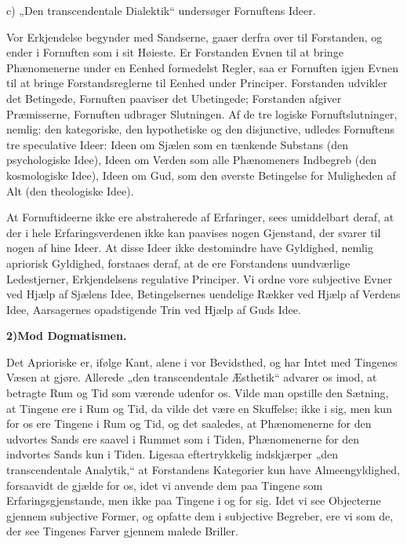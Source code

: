 \documentclass[12pt]{book}
\newcommand{\opage}[1]{\marginnote{\footnotesize\textit{[#1]}}}
\begin{document}
c) „Den transcendentale Dialektik“ undersøger Fornuftens Ideer.

Vor Erkjendelse begynder med Sandserne, gaaer derfra over til Forstanden, og ender
i Fornuften som i sit Høieste. Er Forstanden Evnen til at bringe Phænomenerne under
en Eenhed formedelst Regler, saa er Fornuften igjen Evnen til at bringe
Forstandsreglerne til Eenhed under Principer. Forstanden udvikler det Betingede,
Fornuften paaviser det Ubetingede; Forstanden afgiver Præmisserne, Fornuften
udbrager Slutningen. Af de tre logiske Fornuftslutninger, nemlig: den kategoriske,
den hypothetiske og den disjunctive, udledes Fornuftens tre speculative Ideer:
Ideen om Sjælen som en tænkende Substans (den psychologiske Idee), Ideen om Verden
som alle Phænomeners Indbegreb (den kosmologiske Idee), Ideen om Gud, som den
øverste Betingelse for Muligheden af Alt (den theologiske Idee).

At Fornuftideerne ikke ere abstraherede af Erfaringer, sees umiddelbart deraf, at
der i hele Erfaringsverdenen ikke kan paavises nogen Gjenstand, der svarer til
nogen af hine Ideer. At disse Ideer ikke destomindre have Gyldighed, nemlig
apriorisk Gyldighed, forstaaes deraf, at de ere Forstandens uundværlige
Ledestjerner, Erkjendelsens regulative Principer. Vi ordne vore subjective Evner
ved Hjælp af Sjælens Idee, Betingelsernes uendelige Rækker ved Hjælp af Verdens
Idee, Aarsagernes opadstigende Trin ved Hjælp af Guds Idee.

\begin{center}{\bfseries 2)\quad Mod Dogmatismen.}\end{center}

Det Aprioriske er, ifølge Kant, alene i vor Bevidsthed, og har Intet med Tingenes
Væsen at gjøre. Allerede „den
\opage{28} transcendentale Æsthetik“ advarer os imod, at betragte Rum og Tid som værende
udenfor os. Vilde man opstille den Sætning, at Tingene ere i Rum og Tid, da vilde
det være en Skuffelse; ikke i sig, men kun for os ere Tingene i Rum og Tid, og det
saaledes, at Phænomenerne for den udvortes Sands ere saavel i Rummet som i Tiden,
Phænomenerne for den indvortes Sands kun i Tiden. Ligesaa eftertrykkelig
indskjærper „den transcendentale Analytik,“ at Forstandens Kategorier kun have
Almeengyldighed, forsaavidt de gjælde for os, idet vi anvende dem paa Tingene som
Erfaringsgjenstande, men ikke paa Tingene i og for sig. Idet vi see Objecterne
gjennem subjective Former, og opfatte dem i subjective Begreber, ere vi som de, der
see Tingenes Farver gjennem malede Briller.
\end{document}
